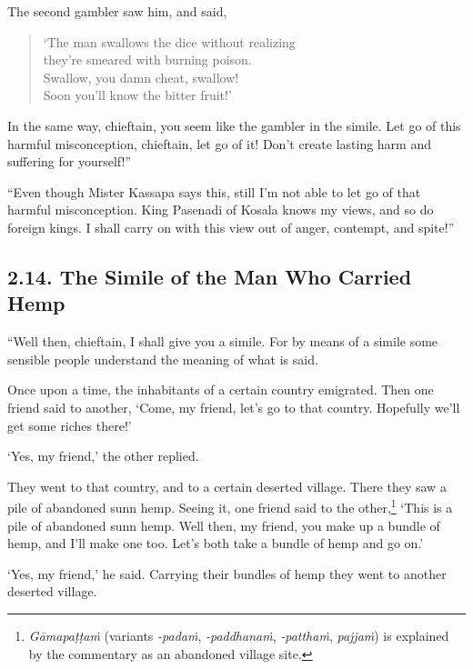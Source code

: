 \documentclass[12pt,openany]{book}%
\begin{document}
The second gambler saw him, and said, 

\begin{verse}%
‘The man swallows the dice without realizing \\
they’re smeared with burning poison. \\
Swallow, you damn cheat, swallow! \\
Soon you’ll know the bitter fruit!’ 

%
\end{verse}

In the same way, chieftain, you seem like the gambler in the simile. Let go of this harmful misconception, chieftain, let go of it! Don’t create lasting harm and suffering for yourself!” 

“Even though Mister Kassapa says this, still I’m not able to let go of that harmful misconception. King Pasenadi of Kosala knows my views, and so do foreign kings. I shall carry on with this view out of anger, contempt, and spite!” 

\subsection*{2.14. The Simile of the Man Who Carried Hemp }

“Well then, chieftain, I shall give you a simile. For by means of a simile some sensible people understand the meaning of what is said. 

Once upon a time, the inhabitants of a certain country emigrated. Then one friend said to another, ‘Come, my friend, let’s go to that country. Hopefully we’ll get some riches there!’ 

‘Yes, my friend,’ the other replied. 

They went to that country, and to a certain deserted village. There they saw a pile of abandoned sunn hemp. Seeing it, one friend said to the other,\footnote{\textit{\textsanskrit{Gāmapaṭṭaṁ}} (variants \textit{-\textsanskrit{padaṁ}}, \textit{-\textsanskrit{paddhanaṁ}}, \textit{-\textsanskrit{patthaṁ}}, \textit{\textsanskrit{pajjaṁ}}) is explained by the commentary as an abandoned village site. } ‘This is a pile of abandoned sunn hemp. Well then, my friend, you make up a bundle of hemp, and I’ll make one too. Let’s both take a bundle of hemp and go on.’ 

‘Yes, my friend,’ he said. Carrying their bundles of hemp they went to another deserted village. 
\end{document}

